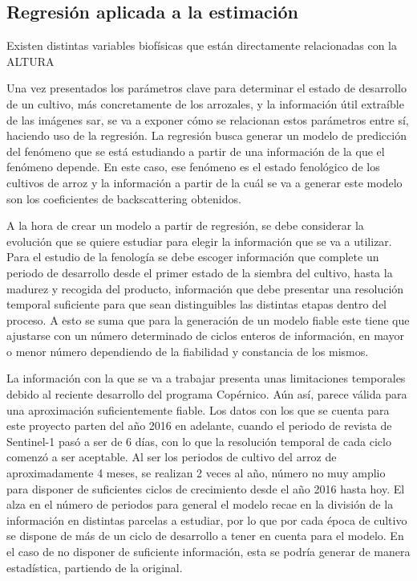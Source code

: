 \subsection{Regresión aplicada a la estimación}
\par Existen distintas variables biofísicas que están directamente relacionadas con la ALTURA
\\
\par Una vez presentados los parámetros clave para determinar el estado de desarrollo de un cultivo, más concretamente de los arrozales, y la  información útil extraíble de las imágenes \gls{sar}, se va a exponer cómo se relacionan estos parámetros entre sí, haciendo uso de la regresión. La regresión busca generar un modelo de predicción del fenómeno que se está estudiando a partir de una información de la que el fenómeno depende. En este caso, ese fenómeno es el estado fenológico de los cultivos de arroz y la información a partir de la cuál se va a generar este modelo son los coeficientes de backscattering obtenidos.
\\
\par A la hora de crear un modelo a partir de regresión, se debe considerar la evolución que se quiere estudiar para elegir la información que se va a utilizar. Para el estudio de la fenología se debe escoger información que complete un periodo de desarrollo desde el primer estado de la siembra del cultivo, hasta la madurez y recogida del producto, información que debe presentar una resolución temporal suficiente para que sean distinguibles las distintas etapas dentro del proceso. A esto se suma que para la generación de un modelo fiable este tiene que ajustarse con un número determinado de ciclos enteros de información, en mayor o menor número dependiendo de la fiabilidad y constancia de los mismos. 
\\
\par La información con la que se va a trabajar presenta unas limitaciones temporales debido al reciente desarrollo del programa Copérnico. Aún así, parece válida para una aproximación suficientemente fiable. Los datos con los que se cuenta para este proyecto parten del año 2016 en adelante, cuando el periodo de revista de Sentinel-1 pasó a ser de 6 días, con lo que la resolución temporal de cada ciclo comenzó a ser aceptable. Al ser los periodos de cultivo del arroz de aproximadamente 4 meses, se realizan 2 veces al año, número no muy amplio para disponer de suficientes ciclos de crecimiento desde el año 2016 hasta hoy. El alza en el número de periodos para general el modelo recae en la división de la información en distintas parcelas a estudiar, por lo que por cada época de cultivo se dispone de más de un ciclo de desarrollo a tener en cuenta para el modelo. En el caso de no disponer de suficiente información, esta se podría generar de manera estadística, partiendo de la original. 
